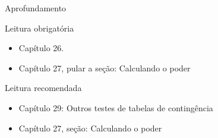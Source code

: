 \documentclass{beamer}
\begin{document}
\begin{frame}{\scriptsize Aprofundamento}
  \begin{block}{Leitura obrigatória}
    \begin{itemize}
      \footnotesize
    \item Capítulo 26.
    \item Capítulo 27, pular a seção: Calculando o poder
    \end{itemize}
  \end{block}
  \begin{block}{Leitura recomendada}
    \begin{itemize}
      \scriptsize
    \item Capítulo 29: Outros testes de tabelas de contingência
    \item Capítulo 27, seção: Calculando o poder
    \end{itemize}
  \end{block}
\end{frame}
\end{document}
